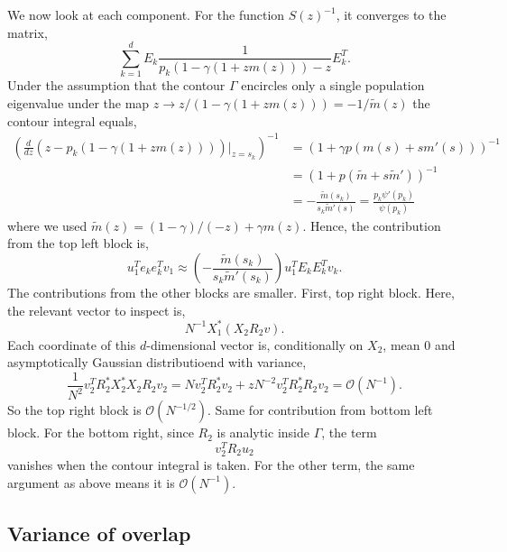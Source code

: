 \documentclass[11 pt, reqno]{article}
\def\beq{\begin{equation}}
\def\eeq{\end{equation}}
\def\O{\mathcal{O}}
\begin{document}
We now look at each component.  For the function $S(z)^{-1}$, it converges to the matrix,
\beq
\sum_{k=1}^d E_k \frac{1}{ p_k(1 - \gamma (1 +z m(z) ) ) - z } E_k^T.
\eeq
Under the assumption that the contour $\Gamma$ encircles only a single population eigenvalue under the map $z \to z / ( 1 - \gamma (1 + z m (z) ) ) = - 1 / \tilde{m} (z) $ the contour integral equals,
\begin{align}
\left( \frac{d}{dz} (z - p_k (1 - \gamma (1+ zm(z) ) )) \bigg\vert_{z = s_k } \right)^{-1} &=\left( 1 + \gamma p (m(s) + s m' (s) ) \right)^{-1} \\
&= \left( 1 + p ( \tilde{m} + s \tilde{m}' ) \right)^{-1} \\
& = - \frac{ \tilde{m} (s_k ) }{ s_k \tilde{m}' (s) } =  \frac{ p_k \psi' ( p_k ) }{ \psi ( p_k ) }
\end{align}
where we used $\tilde{m} (z) = (1-\gamma ) / (-z) + \gamma m (z)$.  Hence, the contribution from the top left block is,
\beq
u_1^T e_k e_k^T v_1 \approx \left( - \frac{ \tilde{m} (s_k ) }{ s_k \tilde{m}' ( s_k ) } \right) u_1^T E_k E_k^T v_k.
\eeq
The contributions from the other blocks are smaller.  First, top right block.  Here, the relevant vector to inspect is,
\beq
N^{-1} X_1^* ( X_2 R_2 v).
\eeq
Each coordinate of this $d$-dimensional vector is, conditionally on $X_2$, mean $0$ and asymptotically Gaussian distributioend with variance,
\beq
\frac{1}{N^2} v_2^T R^*_2 X_2^*X_2 R_2 v_2 = N v_2^T R_2^* v_2 + z N^{-2} v_2^T R_2^* R_2 v_2 = \O (N^{-1} ).
\eeq
So the top right block is $\O(N^{-1/2})$.  Same for contribution from bottom left block.  For the bottom right, since $R_2$ is analytic inside $\Gamma$, the term
\beq
v_2^T R_2 u_2
\eeq
vanishes when the contour integral is taken.  For the other term, the same argument as above means it is $\O (N^{-1})$.  



\subsection{Variance of overlap}
\end{document}
